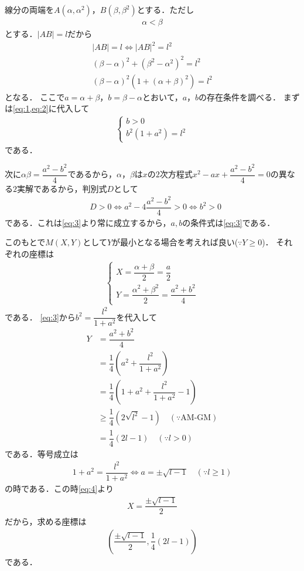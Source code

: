 \documentclass[../../main.tex]{subfiles}
\begin{document}
線分の両端を$A(\alpha,\alpha^2)$，$B(\beta,\beta^2)$とする．ただし
\begin{align}
  \alpha<\beta\label{eq:1}
\end{align}
とする．$|AB|=l$だから
\begin{align}
  |AB|=l \Longleftrightarrow |AB|^2=l^2  \nonumber\\
  (\beta-\alpha)^2+(\beta^2-\alpha^2)^2=l^2  \nonumber\\
  (\beta-\alpha)^2\left(1+(\alpha+\beta)^2\right)=l^2 \label{eq:2}
\end{align}
となる．
ここで$a=\alpha+\beta$，$b=\beta-\alpha$とおいて，$a$，$b$の存在条件を調べる．
まずは\cref{eq:1,eq:2}に代入して
\begin{align}
  \begin{cases}
    b > 0 \\
    b^2(1+a^2)=l^2
  \end{cases} \label{eq:3}
\end{align}
である．

次に$\alpha\beta=\dfrac{a^2-b^2}{4}$であるから，$\alpha$，$\beta$は$x$の$2$次方程式$x^2-ax+\dfrac{a^2-b^2}{4}=0$の異なる$2$実解であるから，判別式$D$として
\begin{align}
  &D>0
  \Longleftrightarrow
  a^2-4\dfrac{a^2-b^2}{4}>0
  \Longleftrightarrow
  b^2>0
\end{align}
である．これは\cref{eq:3}より常に成立するから，$a,b$の条件式は\cref{eq:3}である．

このもとで$M(X,Y)$として$Y$が最小となる場合を考えれば良い($\because Y\ge0$)．
それぞれの座標は
\begin{align}
  \begin{cases}
    X=\dfrac{\alpha+\beta}{2}=\dfrac{a}{2}  \\
    Y=\dfrac{\alpha^2+\beta^2}{2}=\dfrac{a^2+b^2}{4}
  \end{cases} \label{eq:4}
\end{align}
である．
\cref{eq:3}から$b^2=\dfrac{l^2}{1+a^2}$を代入して
\begin{align}
  Y&=\dfrac{a^2+b^2}{4} \\
  &=\dfrac{1}{4}\left(a^2+\dfrac{l^2}{1+a^2}\right)  \\
  &=\dfrac{1}{4}\left(1+a^2+\dfrac{l^2}{1+a^2}-1\right)  \\
  &\ge \dfrac{1}{4}\left(2\sqrt{l^2}-1\right) \quad (\because \text{AM-GM})\\
  &=\dfrac{1}{4}\left(2l-1\right) \quad (\because l>0)
\end{align}
である．等号成立は
\begin{align}
  1+a^2=\dfrac{l^2}{1+a^2} \Longleftrightarrow a = \pm \sqrt{l-1} \quad (\because l \ge 1)
\end{align}
の時である．この時\cref{eq:4}より
\begin{align}
  X=\dfrac{\pm\sqrt{l-1}}{2}
\end{align}
だから，求める座標は
\begin{align}
  \left(\dfrac{\pm\sqrt{l-1}}{2},\dfrac{1}{4}\left(2l-1\right)\right)
\end{align}
である．

\newpage
\end{document}
